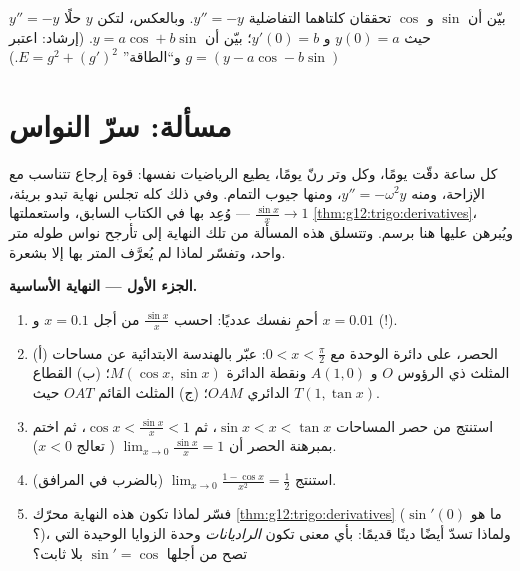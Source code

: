 \begin{exercise}[$\star\star\star$]\label{exo:g12:trigo:9}
بيّن أن $\sin$ و $\cos$ تحققان كلتاهما  التفاضلية
$y'' = -y$. وبالعكس، لتكن $y$ حلًا  $y'' = -y$ حيث
$y(0) = a$ و $y'(0) = b$؛ بيّن أن $y = a\cos + b\sin$.
(إرشاد: اعتبر $g = (y - a\cos - b\sin)$ و``الطاقة''
$E = g^2 + (g')^2$.)
\end{exercise}

\section{مسألة: سرّ النواس}

\begin{problem}
\label{pb:g12:trigo:1}
كل ساعة دقّت يومًا، وكل وتر رنّ يومًا،
يطيع الرياضيات نفسها: قوة إرجاع تتناسب مع
الإزاحة، ومنه  $y'' = -\omega^2 y$، ومنها
جيوب التمام. وفي  ذلك كله تجلس نهاية تبدو بريئة،
$\frac{\sin x}{x} \to 1$ --- وُعِد بها في الكتاب السابق، واستعملتها
\cref{thm:g12:trigo:derivatives}، ويُبرهن عليها هنا برسم.
وتتسلق هذه المسألة من تلك النهاية إلى تأرجح نواس طوله متر
واحد، وتفسّر لماذا لم يُعرَّف المتر بها إلا بشعرة.

\medskip
\noindent\textbf{الجزء الأول --- النهاية الأساسية.}
\begin{enumerate}
  \item أحمِ نفسك عدديًا: احسب $\frac{\sin x}{x}$ من أجل
        $x = 0.1$ و $x = 0.01$ (!).
  \item الحصر، على دائرة الوحدة مع
        $0 < x < \frac\pi2$: عبّر بالهندسة الابتدائية عن
        مساحات (أ) المثلث ذي الرؤوس $O$ و $A(1,0)$
        ونقطة الدائرة $M(\cos x, \sin x)$؛ (ب) القطاع
        الدائري $OAM$؛ (ج) المثلث القائم $OAT$
        حيث $T(1, \tan x)$.
  \item استنتج من حصر المساحات
        $\sin x < x < \tan x$، ثم
        $\cos x < \frac{\sin x}{x} < 1$، ثم اختم بمبرهنة
        الحصر أن
        $\lim_{x \to 0} \frac{\sin x}{x} = 1$ ( تعالج
        $x < 0$).
  \item استنتج
        $\lim_{x \to 0} \frac{1 - \cos x}{x^2} = \frac12$
        (بالضرب في المرافق).
  \item فسّر لماذا تكون هذه النهاية محرّك
        \cref{thm:g12:trigo:derivatives} (ما هو
        $\sin'(0)$؟)، ولماذا تسدّ أيضًا دينًا قديمًا: بأي
        معنى تكون \emph{الراديانات} وحدة الزوايا الوحيدة
        التي تصح من أجلها $\sin' = \cos$ بلا ثابت؟
\end{enumerate}


\end{problem}

